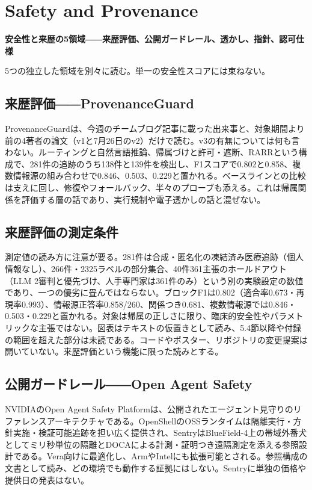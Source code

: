 \section{Safety and Provenance}
\begin{wideflow}
{\Large\bfseries 安全性と来歴の5領域――来歴評価、公開ガードレール、透かし、指針、認可仕様}\par
\smallskip
{\color{SurveyMuted}5つの独立した領域を別々に読む。単一の安全性スコアには束ねない。}\par
\end{wideflow}

\subsection*{来歴評価――ProvenanceGuard}
ProvenanceGuardは、今週のチームブログ記事に載った出来事と、対象期間より前の4著者の論文（v1と7月26日のv2）だけで読む\cite{provguard}。v3の有無については何も言わない。ルーティングと自然言語推論、帰属づけと許可・遮断、RARRという構成で、281件の追跡のうち138件と139件を検出し、F1スコアで0.802と0.858、複数情報源の組み合わせで0.846、0.503、0.229と置かれる。ベースラインとの比較は支えに回し、修復やフォールバック、半々のプローブも添える。これは帰属関係を評価する層の話であり、実行規制や電子透かしの話と混ぜない。

\subsection*{来歴評価の測定条件}
測定値の読み方に注意が要る。281件は合成・匿名化の凍結済み医療追跡（個人情報なし）、266件・2325ラベルの部分集合、40件361主張のホールドアウト（LLM 2審判と優先づけ、人手専門家は361件のみ）という別の実験設定の数値であり、一つの優劣に畳んではならない。ブロックF1は0.802（適合率0.673・再現率0.993）、情報源正答率0.858/260、関係つき0.681、複数情報源では0.846・0.503・0.229と置かれる。対象は帰属の正しさに限り、臨床的安全性やパラメトリックな主張ではない。図表はテキストの仮置きとして読み、5.4節以降や付録の範囲を超えた部分は未読である。コードやポスター、リポジトリの変更提案は開いていない。来歴評価という機能に限った読みとする。

\subsection*{公開ガードレール――Open Agent Safety}
NVIDIAのOpen Agent Safety Platformは、公開されたエージェント見守りのリファレンスアーキテクチャである\cite{agentsafety}。OpenShellのOSSランタイムは隔離実行・方針実施・検証可能追跡を担い広く提供され、SentryはBlueField-4上の帯域外番犬としてミリ秒単位の隔離とDOCAによる計測・証明つき遠隔測定を添える参照設計である。Vera向けに最適化し、ArmやIntelにも拡張可能とされる。参照構成の文書として読み、どの環境でも動作する証拠にはしない。Sentryに単独の価格や提供日の発表はない。

